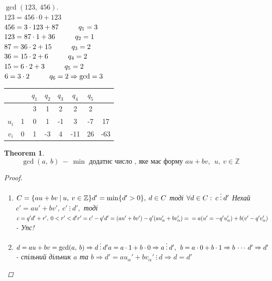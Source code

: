 \documentclass[a4paper,12pt, centered]{bookest}
\newtheorem{theorem}{Theorem}[section]
\DeclareMathOperator{\blank}{ }
\newcommand\tab[1][1cm]{\hspace*{#1}}
\begin{document}
\begin{example}
	$\gcd(123,\>456).$\\
	$123=456\cdot 0+123$\\
	$456=3\cdot 123+87\tab q_1=3$\\
	$123=87\cdot 1+36\tab q_2=1$\\
	$87=36\cdot 2+15\tab q_3=2$\\
	$36=15\cdot 2+6\tab q_4=2$\\
	$15=6\cdot 2+3\tab q_5=2$\\
	$6=3\cdot2\tab q_6=2\Rightarrow \gcd = 3\\$
	\begin{center}
	\begin{tabular}{ |c|c|c|c|c|c|c|c| } 
 		\hline
 		$\blank$ & $\blank$ & $q_1$ & $q_2$ & $q_3$ & $q_4$ & $q_5$ & $\blank$\\ \hline
 		$\blank$ & $\blank$ & 3 & 1 & 2 & 2 & 2 & $\blank$\\ \hline
 		$u_i$ & 1 & 0 & 1 & -1 & 3 & -7 & 17\\ \hline
 		$v_i$ & 0 & 1 & -3 & 4 & -11 & 26 & -63\\ 
 		\hline
	\end{tabular}
	\end{center}
\end{example}
\begin{theorem}
	$$\gcd(a,\>b)\>-\>\min\textrm{ додатнє число , яке має форму } au+bv,\>\>u,\>v\in\mathbb{Z}$$
	\begin{proof}$ $
		\begin{enumerate}
  \item $C=\{au+bv\>|\>u,\>v\in\mathbb{Z}\}\\ d'=\min\{d'>0\},\>d\in C$ тоді $\forall d\in C:\>c\>\vdots\>d'\\$ Нехай $c'=au'+bv',\>c'\>\vdots\>d',$ тоді $c=q'd'+r',\>0<r'<d'\\r'=c'-q'd'=(au'+bv')-q'(au'_\alpha+bv'_\alpha)=\\=a(u'=-q'u'_\alpha)+b(v'-q'v'_\alpha)$ - Упс!
  \item $d=au+bv=\gcd(a,\>b)\Rightarrow d\>\vdots\>d'\\a=a\cdot1+b\cdot0\Rightarrow a\>\vdots\>d',\>\>b=a\cdot0+b\cdot1\Rightarrow b\>\cdots\>d'\\\Rightarrow d'$ - спільний дільник $a$ та  $b\Rightarrow d'=au_\alpha'+bv_\alpha'\>\vdots\>d\Rightarrow d=d'$
		\end{enumerate}
	\end{proof}
\end{theorem}
\end{document}
